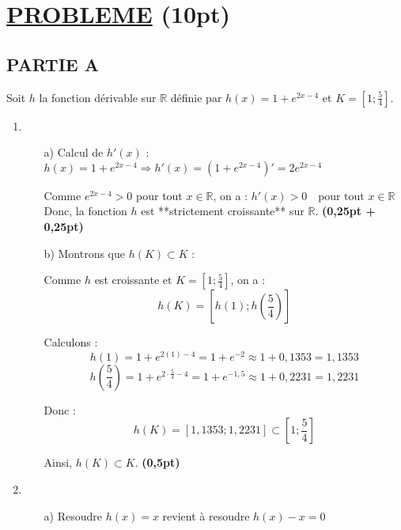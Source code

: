 \documentclass[12pt,a4paper]{article}
\begin{document}
\section*{\underline{PROBLEME} \hfill (10pt)}

\subsection*{PARTIE A}

Soit \( h \) la fonction dérivable sur \( \mathbb{R} \) définie par \( h(x) = 1 + e^{2x - 4} \) et \( K = \left[ 1 ; \frac{5}{4} \right] \).

\begin{enumerate}
    \item
          \begin{enumerate}
              \item[a)] Calcul de \( h'(x) \) :
                  \(
                  h(x) = 1 + e^{2x - 4} \Rightarrow h'(x) =  \left(1 + e^{2x - 4} \right)' = 2e^{2x - 4}
                  \)

                  Comme \( e^{2x - 4} > 0 \) pour tout \( x \in \mathbb{R} \), on a :
                  \(
                  h'(x) > 0 \quad \text{pour tout } x \in \mathbb{R}
                  \)
                  Donc, la fonction \( h \) est **strictement croissante** sur \( \mathbb{R} \). \hfill \textbf{(0,25pt + 0,25pt)}

              \item[b)] Montrons que \( h(K) \subset K \) :

                  Comme \( h \) est croissante et \( K = \left[1 ; \frac{5}{4}\right] \), on a :
                  \[
                      h(K) = \left[ h(1) ; h\left(\frac{5}{4}\right) \right]
                  \]

                  Calculons :
                  \[
                      h(1) = 1 + e^{2(1) - 4} = 1 + e^{-2} \approx 1 + 0{,}1353 = 1{,}1353
                  \]
                  \[
                      h\left(\frac{5}{4}\right) = 1 + e^{2 \cdot \frac{5}{4} - 4} = 1 + e^{-1{,}5} \approx 1 + 0{,}2231 = 1{,}2231
                  \]

                  Donc :
                  \[
                      h(K) = \left[1{,}1353 ; 1{,}2231\right] \subset \left[1 ; \frac{5}{4}\right]
                  \]

                  Ainsi, \( h(K) \subset K \). \hfill \textbf{(0,5pt)}
          \end{enumerate}
    \item
          \begin{enumerate}
              \item[a)] Resoudre \( h(x) = x \)  revient à resoudre \( h(x) - x = 0 \)


\end{enumerate}
\end{enumerate}
\end{document}
